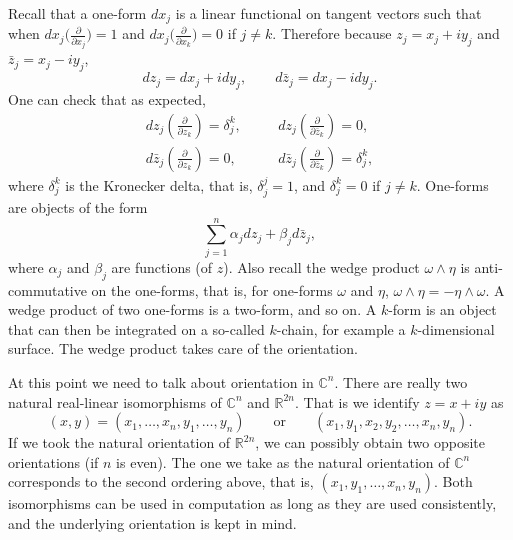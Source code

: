 \documentclass[12pt,openany]{book}
\newcommand{\C}{{\mathbb{C}}}
\newcommand{\R}{{\mathbb{R}}}
\theoremstyle{plain}
\theoremstyle{remark}
\theoremstyle{definition}
\theoremstyle{exercise}
\theoremstyle{example}
\begin{document}
Recall that a one-form $d x_j$ is a linear functional on tangent vectors
such that when $d x_j \bigl( \frac{\partial}{\partial x_j} \bigr) = 1$ and
$d x_j \bigl( \frac{\partial}{\partial x_k} \bigr) = 0$ if $j \not= k$.  Therefore because
$z_j = x_j + i y_j$ and
$\bar{z}_j = x_j - i y_j$,
\begin{equation*}
d z_j = d x_j + i d y_j , 
\qquad
d \bar{z}_j = d x_j - i d y_j . 
\end{equation*}
One can check that as expected,
\begin{equation*}
\begin{array}{lll}
d z_j \left( \frac{\partial}{\partial z_k} \right) = \delta_j^k ,
& \quad &
d z_j \left( \frac{\partial}{\partial \bar{z}_k} \right) = 0 , \\
d \bar{z}_j \left( \frac{\partial}{\partial z_k} \right) = 0 ,
& \quad &
d \bar{z}_j \left( \frac{\partial}{\partial \bar{z}_k} \right) = \delta_j^k
,
\end{array}
\end{equation*}
where $\delta_{j}^k$ is the Kronecker delta, that is, $\delta_j^j = 1$,
and $\delta_j^k = 0$ if $j \not= k$.  One-forms are objects of the form
\begin{equation*}
\sum_{j=1}^n \alpha_j d z_j + 
\beta_j d \bar{z}_j ,
\end{equation*}
where $\alpha_j$ and $\beta_j$ are functions (of $z$).
Also recall the wedge product $\omega \wedge \eta$ is anti-commutative on the
one-forms,
that is, for one-forms $\omega$ and $\eta$,
$\omega \wedge \eta = - \eta \wedge \omega$.  A wedge product of two
one-forms is a two-form, and so on.  A $k$-form is an object that 
can then be integrated on a so-called $k$-chain, for example a
$k$-dimensional surface.  The wedge product takes care of the orientation.

At this point we need to talk about orientation in $\C^n$.  There are really two
natural real-linear isomorphisms of $\C^n$ and $\R^{2n}$.  That is we
identify $z = x+iy$ as
\begin{equation*}
(x,y) = (x_1,\ldots,x_n,y_1,\ldots,y_n) \qquad
\text{or} \qquad
(x_1,y_1,x_2,y_2,\ldots,x_n,y_n) .
\end{equation*}
If we took the natural orientation of $\R^{2n}$,
we can possibly obtain two opposite orientations (if $n$ is even).
The one we take as the natural orientation of $\C^n$ corresponds to
the second ordering above, that
is, $(x_1,y_1,\ldots,x_n,y_n)$.  Both isomorphisms can be used
in computation as long as they are used consistently, and the underlying
orientation is kept in mind.
\end{document}
